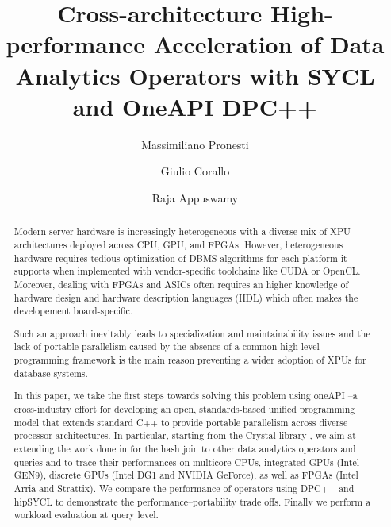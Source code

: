 \documentclass[sigconf, nonacm]{acmart}
\begin{document}
\title{Cross-architecture High-performance Acceleration of Data Analytics Operators with SYCL and OneAPI DPC++}

\author{Massimiliano Pronesti}

\author{Giulio Corallo}

\author{Raja Appuswamy}


\begin{abstract}
Modern server hardware is increasingly heterogeneous with a diverse mix of XPU architectures deployed across CPU, GPU, and FPGAs. 
However, heterogeneous hardware requires tedious optimization of DBMS algorithms for each platform it supports when
implemented with vendor-specific toolchains like CUDA or OpenCL. Moreover, dealing with FPGAs and ASICs often requires an higher knowledge of hardware design and hardware description languages (HDL) which often makes the developement board-specific.

Such an approach inevitably leads to specialization and maintainability issues and the lack of portable parallelism caused by the absence of a common high-level programming framework is the main reason preventing a wider adoption of XPUs for database systems.

In this paper, we take the first steps towards solving this problem using oneAPI –a cross-industry effort for developing an open, standards-based unified programming model that extends standard C++ to provide portable parallelism across diverse processor architectures. In particular, starting from the Crystal library \cite{crystal}, we aim at extending the work done in \cite{xjoin} for the hash join to other data analytics operators and queries and to trace their performances on multicore CPUs, integrated GPUs (Intel GEN9), discrete GPUs (Intel DG1 and NVIDIA GeForce), as well as FPGAs (Intel Arria and Strattix). We compare the performance of operators using DPC++ and hipSYCL \cite{hipsycl} to demonstrate the performance–portability trade offs. Finally we perform a workload evaluation at query level.
\end{abstract}
\end{document}
